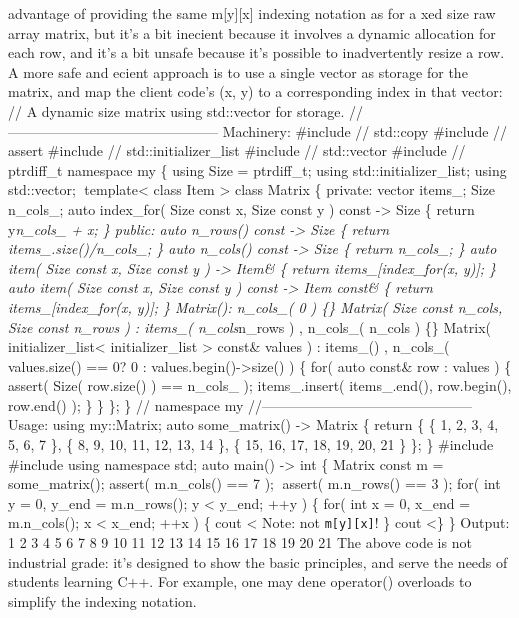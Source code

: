 advantage of providing the same m{[}y{]}{[}x{]} indexing notation as for
a xed size raw array matrix, but it's a bit inecient because it involves
a dynamic allocation for each row, and it's a bit unsafe because it's
possible to inadvertently resize a row. A more safe and ecient approach
is to use a single vector as storage for the matrix, and map the client
code's (x, y) to a corresponding index in that vector: // A dynamic size
matrix using std::vector for storage.
//--------------------------------------------- Machinery: \#include //
std::copy \#include // assert \#include // std::initializer\_list
\#include // std::vector \#include // ptrdiff\_t namespace my \{ using
Size = ptrdiff\_t; using std::initializer\_list; using std::vector;
template\textless{} class Item \textgreater{} class Matrix \{ private:
vector items\_; Size n\_cols\_; auto index\_for( Size const x, Size
const y ) const -\textgreater{} Size \{ return y\emph{n\_cols\_ + x; \}
public: auto n\_rows() const -\textgreater{} Size \{ return
items\_.size()/n\_cols\_; \} auto n\_cols() const -\textgreater{} Size
\{ return n\_cols\_; \} auto item( Size const x, Size const y )
-\textgreater{} Item\& \{ return items\_{[}index\_for(x, y){]}; \} auto
item( Size const x, Size const y ) const -\textgreater{} Item const\& \{
return items\_{[}index\_for(x, y){]}; \} Matrix(): n\_cols\_( 0 ) \{\}
Matrix( Size const n\_cols, Size const n\_rows ) : items\_(
n\_cols}n\_rows ) , n\_cols\_( n\_cols ) \{\} Matrix(
initializer\_list\textless{} initializer\_list \textgreater{} const\&
values ) : items\_() , n\_cols\_( values.size() == 0? 0 :
values.begin()-\textgreater size() ) \{ for( auto const\& row : values )
\{ assert( Size( row.size() ) == n\_cols\_ ); items\_.insert(
items\_.end(), row.begin(), row.end() ); \} \} \}; \} // namespace my
//--------------------------------------------- Usage: using my::Matrix;
auto some\_matrix() -\textgreater{} Matrix \{ return \{ \{ 1, 2, 3, 4,
5, 6, 7 \}, \{ 8, 9, 10, 11, 12, 13, 14 \}, \{ 15, 16, 17, 18, 19, 20,
21 \} \}; \} \#include \#include using namespace std; auto main()
-\textgreater{} int \{ Matrix const m = some\_matrix(); assert(
m.n\_cols() == 7 ); assert( m.n\_rows() == 3 ); for( int y = 0, y\_end
= m.n\_rows(); y \textless{} y\_end; ++y ) \{ for( int x = 0, x\_end =
m.n\_cols(); x \textless{} x\_end; ++x ) \{ cout \textless{} Note: not
\passthrough{\lstinline!m[y][x]!}! \} cout \textless\} \} Output: 1 2 3
4 5 6 7 8 9 10 11 12 13 14 15 16 17 18 19 20 21 The above code is not
industrial grade: it's designed to show the basic principles, and serve
the needs of students learning C++. For example, one may dene operator()
overloads to simplify the indexing notation.
